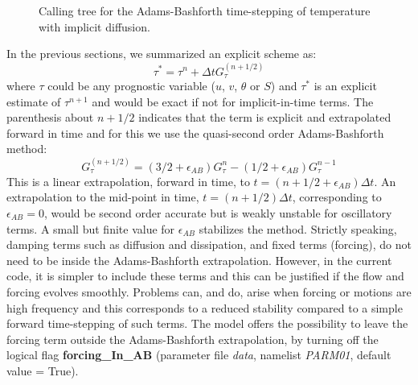 \begin{figure}
\begin{center}  \end{center}
\caption{
Calling tree for the Adams-Bashforth time-stepping of temperature with
implicit diffusion.}
\label{fig:call-tree-adams-bashforth}
\end{figure}

In the previous sections, we summarized an explicit scheme as:
\begin{equation}
\tau^{*} = \tau^{n} + \Delta t G_\tau^{(n+1/2)}
\label{eq:taustar}
\end{equation}
where $\tau$ could be any prognostic variable ($u$, $v$, $\theta$ or
$S$) and $\tau^*$ is an explicit estimate of $\tau^{n+1}$ and would be
exact if not for implicit-in-time terms. The parenthesis about $n+1/2$
indicates that the term is explicit and extrapolated forward in time
and for this we use the quasi-second order Adams-Bashforth method:
\begin{equation}
G_\tau^{(n+1/2)} = ( 3/2 + \epsilon_{AB}) G_\tau^n
- ( 1/2 + \epsilon_{AB}) G_\tau^{n-1}
\label{eq:adams-bashforth2}
\end{equation}
This is a linear extrapolation, forward in time, to
$t=(n+1/2+{\epsilon_{AB}})\Delta t$. An extrapolation to the mid-point
in time, $t=(n+1/2)\Delta t$, corresponding to $\epsilon_{AB}=0$,
would be second order accurate but is weakly unstable for oscillatory
terms. A small but finite value for $\epsilon_{AB}$ stabilizes the
method. Strictly speaking, damping terms such as diffusion and
dissipation, and fixed terms (forcing), do not need to be inside the
Adams-Bashforth extrapolation. However, in the current code, it is
simpler to include these terms and this can be justified if the flow
and forcing evolves smoothly. Problems can, and do, arise when forcing
or motions are high frequency and this corresponds to a reduced
stability compared to a simple forward time-stepping of such terms.
The model offers the possibility to leave the forcing term outside the 
Adams-Bashforth extrapolation, by turning off the logical flag 
{\bf forcing\_In\_AB } (parameter file {\em data}, namelist {\em PARM01}, 
default value = True).

